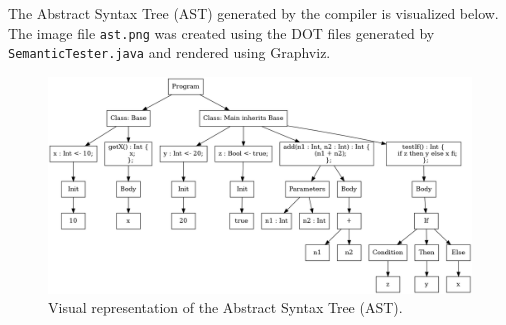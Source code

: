 \documentclass[12pt]{article}
\begin{document}
The Abstract Syntax Tree (AST) generated by the compiler is visualized below. The image file \texttt{ast.png} was created using the DOT files generated by \texttt{SemanticTester.java} and rendered using Graphviz.

\begin{figure}[H]
  \centering
  \includegraphics[width=\linewidth]{ast.png}
  \caption{Visual representation of the Abstract Syntax Tree (AST).}
  \label{fig:ast}
\end{figure}
\end{document}
